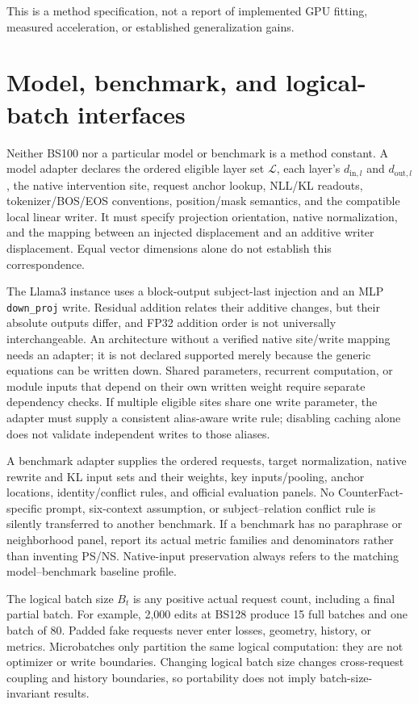 \documentclass[11pt]{article}
\newcommand{\Lset}{\mathcal L}
\begin{document}
This is a method specification, not a report of implemented GPU fitting,
measured acceleration, or established generalization gains.

\clearpage
\section{Model, benchmark, and logical-batch interfaces}

Neither BS100 nor a particular model or benchmark is a method constant.
A model adapter declares the ordered eligible layer set $\Lset$, each
layer's $d_{\mathrm{in},l}$ and $d_{\mathrm{out},l}$, the native intervention
site, request anchor lookup, NLL/KL readouts, tokenizer/BOS/EOS conventions,
position/mask semantics, and the compatible local linear writer. It must
specify projection orientation, native normalization, and the mapping
between an injected displacement and an additive writer displacement.
Equal vector dimensions alone do not establish this correspondence.

The Llama3 instance uses a block-output subject-last injection and an MLP
\texttt{down\_proj} write. Residual addition relates their additive changes,
but their absolute outputs differ, and FP32 addition order is not
universally interchangeable. An architecture without a verified native
site/write mapping needs an adapter; it is not declared supported merely
because the generic equations can be written down. Shared parameters,
recurrent computation, or module inputs that depend on their own written
weight require separate dependency checks. If multiple eligible sites share
one write parameter, the adapter must supply a consistent alias-aware
write rule; disabling caching alone does not validate independent writes
to those aliases.

A benchmark adapter supplies the ordered requests, target normalization,
native rewrite and KL input sets and their weights, key inputs/pooling,
anchor locations, identity/conflict rules, and official evaluation panels.
No CounterFact-specific prompt, six-context assumption, or
subject--relation conflict rule is silently transferred to another
benchmark. If a benchmark has no paraphrase or neighborhood panel, report
its actual metric families and denominators rather than inventing PS/NS.
Native-input preservation always refers to the matching model--benchmark
baseline profile.

The logical batch size $B_t$ is any positive actual request count,
including a final partial batch. For example, 2,000 edits at BS128 produce
15 full batches and one batch of 80. Padded fake requests never enter
losses, geometry, history, or metrics. Microbatches only partition the
same logical computation: they are not optimizer or write boundaries.
Changing logical batch size changes cross-request coupling and history
boundaries, so portability does not imply batch-size-invariant results.
\end{document}
